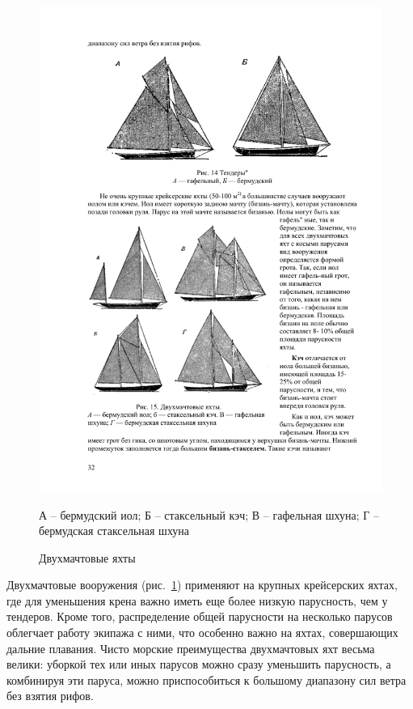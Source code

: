 \documentclass[a4paper, 12pt, twoside, final]{scrbook}
\begin{document}
\begin{figure}[htbp]
	\begin{centering}
		\includegraphics{Dvukhmachtovye_yakhty}
		\par
	\end{centering}
	\protect\caption{\label{fig:15}Двухмачтовые яхты}
	\centering{}\small А \--- бермудский иол; Б \--- стаксельный кэч; В \--- гафельная шхуна; Г \--- бермудская стаксельная шхуна
\end{figure}


Двухмачтовые вооружения (рис.~\ref{fig:15})
применяют на крупных крейсерских яхтах, где для уменьшения крена важно
иметь еще более низкую парусность, чем у тендеров. Кроме того, распределение
общей парусности на несколько парусов облегчает работу экипажа с ними,
что особенно важно на яхтах, совершающих дальние плавания. Чисто морские
преимущества двухмачтовых яхт весьма велики: уборкой тех или иных
парусов можно сразу уменьшить парусность, а комбинируя эти паруса,
можно приспособиться к большому диапазону сил ветра без взятия рифов.
\end{document}
